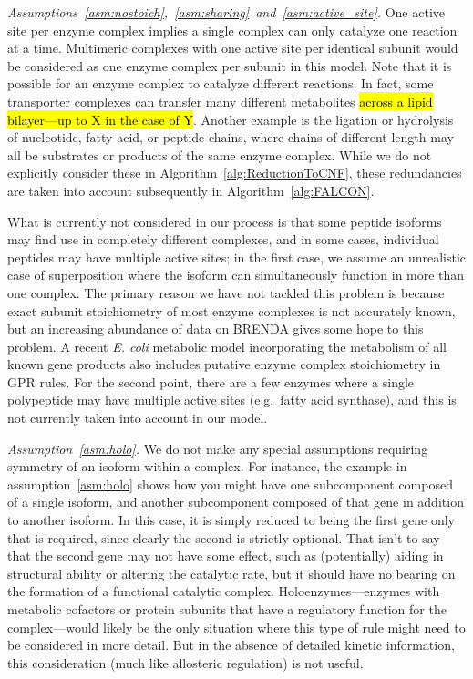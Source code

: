 \emph{Assumptions~\ref{asm:nostoich},~\ref{asm:sharing}~and~\ref{asm:active_site}.}
One active site per enzyme complex implies a single complex can only
catalyze one reaction at a time. Multimeric complexes with one active
site per identical subunit would be considered as one enzyme complex
per subunit in this model.  Note that it is possible for an enzyme
complex to catalyze different reactions. In fact, some transporter
complexes can transfer many different metabolites \hl{across a lipid
  bilayer---up to X in the case of Y}. Another example is the ligation or hydrolysis of
nucleotide, fatty acid, or peptide chains, where chains of different
length may all be substrates or products of the same enzyme
complex. While we do not explicitly consider these in
Algorithm~\ref{alg:ReductionToCNF}, these redundancies are taken into
account subsequently in Algorithm~\ref{alg:FALCON}.

What is currently not considered in our process is that some peptide
isoforms may find use in completely different complexes, and in some
cases, individual peptides may have multiple active sites; in the
first case, we assume an unrealistic case of superposition where the
isoform can simultaneously function in more than one complex. The
primary reason we have not tackled this problem is because exact
subunit stoichiometry of most enzyme complexes is not accurately
known, but an increasing abundance of data on BRENDA
\citep{Schomburg2013} gives some hope to this problem. A recent
\textit{E. coli} metabolic model incorporating the metabolism of all
known gene products \citep{O'Brien2013} also includes putative
enzyme complex stoichiometry in GPR rules. For the second point, there
are a few enzymes where a single polypeptide may have multiple active
sites (e.g.\ fatty acid synthase), and this is not currently taken into
account in our model. 

\emph{Assumption~\ref{asm:holo}.}
We do not make any special assumptions requiring symmetry of an
isoform within a complex. For instance, the example in
assumption~\ref{asm:holo} shows how you might have one subcomponent
composed of a single isoform, and another subcomponent composed of
that gene in addition to another isoform. In this case, it is simply
reduced to being the first gene only that is required, since clearly
the second is strictly optional. That isn't to say that the second
gene may not have some effect, such as (potentially) aiding in
structural ability or altering the catalytic rate, but it should have
no bearing on the formation of a functional catalytic
complex. Holoenzymes---enzymes with metabolic cofactors or protein
subunits that have a regulatory function for the complex---would
likely be the only situation where this type of rule might need to be
considered in more detail. But in the absence of detailed kinetic
information, this consideration (much like allosteric
regulation) is not useful.


